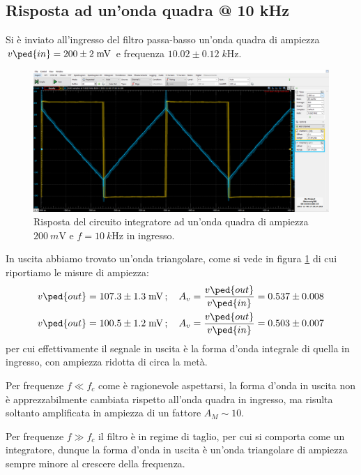 \documentclass[10pt,a4paper]{article}
\begin{document}
\subsection{Risposta ad un'onda quadra @ 10 kHz}
Si è inviato all'ingresso del filtro passa-basso un'onda quadra di
ampiezza $v\ped{in} = 200 \pm 2 \; \si{m\V}$ e frequenza
$10.02 \pm 0.12 \; \si{k\Hz}$.

\begin{figure}[htbp]
\centering
\includegraphics[scale=0.42]{integratore}
\caption{Risposta del circuito integratore ad un'onda quadra di ampiezza
$\SI{200}{m\V}$ e $f = \SI{10}{k\Hz}$ in ingresso. \label{fig: intsqw}}
\end{figure}

In uscita abbiamo trovato un'onda triangolare, come si vede in figura
\ref{fig: intsqw} di cui riportiamo le misure di ampiezza:
\begin{align*}
v\ped{out} = 107.3 \pm 1.3 \; \si{m\V} \, ; \quad
A_v = \frac{v\ped{out}}{v\ped{in}} = 0.537 \pm 0.008 \\
v\ped{out} = 100.5 \pm 1.2 \; \si{m\V} \, ; \quad
A_v = \frac{v\ped{out}}{v\ped{in}} = 0.503 \pm 0.007
\end{align*}
per cui effettivamente il segnale in uscita è la forma d'onda integrale
di quella in ingresso, con ampiezza ridotta di circa la metà.

Per frequenze $f \ll f_c$ come è ragionevole aspettarsi, la forma d'onda in
uscita non è apprezzabilmente cambiata rispetto all'onda quadra in ingresso,
ma risulta soltanto amplificata in ampiezza di un fattore $A_M \sim 10$.

Per frequenze $f \gg f_c$ il filtro è in regime di taglio, per cui si comporta
come un integratore, dunque la forma d'onda in uscita è un'onda triangolare di
ampiezza sempre minore al crescere della frequenza.
\end{document}
